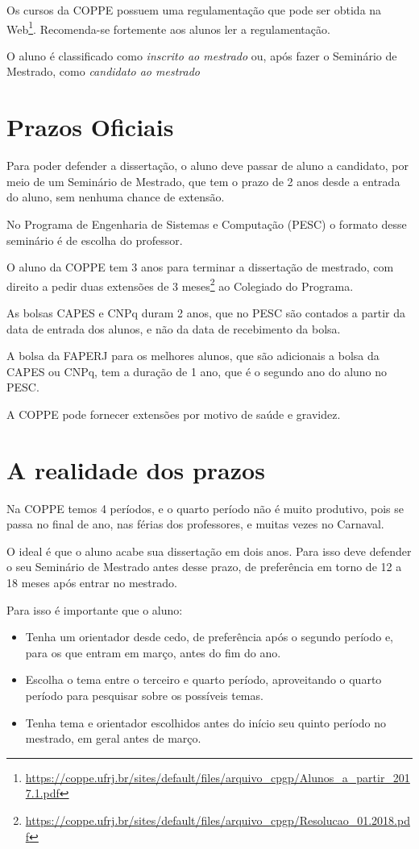 \documentclass[a4paper,12pt]{report}
\begin{document}
Os cursos da COPPE possuem uma regulamentação que pode ser obtida na Web\footnote{\url{https://coppe.ufrj.br/sites/default/files/arquivo_cpgp/Alunos_a_partir_2017.1.pdf}}. Recomenda-se fortemente aos alunos ler a regulamentação.

O aluno é classificado como \textit{inscrito ao mestrado} ou, após fazer o Seminário de Mestrado, como \textit{candidato ao mestrado}

\section{Prazos Oficiais}

Para poder defender a dissertação, o aluno deve passar de aluno a candidato, por meio de um Seminário de Mestrado, que tem o prazo de 2 anos desde a entrada do aluno, sem nenhuma chance de extensão.

No Programa de Engenharia de Sistemas e Computação (PESC) o formato desse seminário é de escolha do professor.

O aluno da COPPE tem 3 anos para terminar a dissertação de mestrado, com direito a pedir duas extensões de 3 meses\footnote{\url{https://coppe.ufrj.br/sites/default/files/arquivo_cpgp/Resolucao_01.2018.pdf}} ao Colegiado do Programa.

As bolsas CAPES e CNPq duram 2 anos, que no PESC são contados a partir da data de entrada dos alunos, e não da data de recebimento da bolsa.

A bolsa da FAPERJ para os melhores alunos, que são adicionais a bolsa da CAPES ou CNPq, tem a duração de 1 ano, que é o segundo ano do aluno no PESC.

A COPPE pode fornecer extensões por motivo de saúde e gravidez.

\section{A realidade dos prazos}

Na COPPE temos 4 períodos, e o quarto período não é muito produtivo, pois se passa no final de ano, nas férias dos professores, e muitas vezes no Carnaval.

O ideal é que o aluno acabe sua dissertação em dois anos. Para isso deve defender o seu Seminário de Mestrado antes desse prazo, de preferência em torno de 12 a 18 meses após entrar no mestrado.

Para isso é importante que o aluno:
\begin{itemize}
    \item Tenha um orientador desde cedo, de preferência após o segundo período e, para os que entram em março, antes do fim do ano.
    \item Escolha o tema entre o terceiro e quarto período, aproveitando o quarto período para pesquisar sobre os possíveis temas.
    \item Tenha  tema e orientador escolhidos antes do início seu quinto período no mestrado, em geral antes de março.
\end{itemize}
\end{document}
